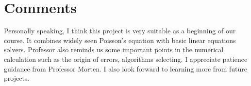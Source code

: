 \documentclass[12pt]{article}
\begin{document}
\section{Comments}
Personally speaking, I think this project is very suitable as a beginning of our course. It combines widely seen Poisson's equation with basic linear equations solvers. Professor also reminds us some important points in the numerical calculation such as the origin of errors, algorithms selecting. I appreciate patience guidance from Professor Morten. I also look forward to learning more from future projects.








\end{document}
